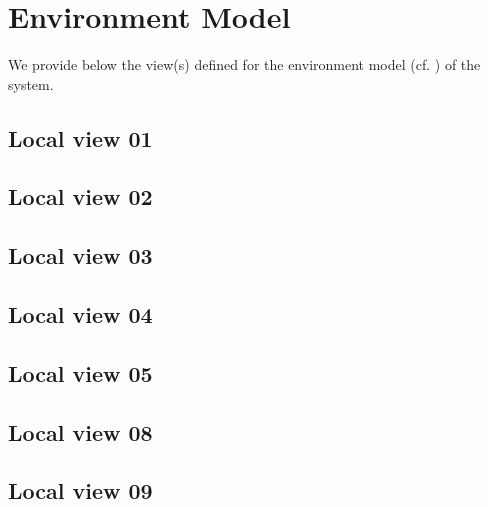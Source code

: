 \chapter{Environment Model}
\label{chap:lu.uni.lassy.excalibur.examples.icrash-EM}



We provide below the view(s) defined for the \msrmessir environment model (cf. \cite{messirbook}) of the system. 


\section{Local view 01}
\label{sec:lu.uni.lassy.excalibur.examples.icrash-EM-view-01-local}

\section{Local view 02}
\label{sec:lu.uni.lassy.excalibur.examples.icrash-EM-view-02-local}

\section{Local view 03}
\label{sec:lu.uni.lassy.excalibur.examples.icrash-EM-view-03-local}

\section{Local view 04}
\label{sec:lu.uni.lassy.excalibur.examples.icrash-EM-view-04-local}

\section{Local view 05}
\label{sec:lu.uni.lassy.excalibur.examples.icrash-EM-view-05-local}

\section{Local view 08}
\label{sec:lu.uni.lassy.excalibur.examples.icrash-EM-view-08-local}

\section{Local view 09}
\label{sec:lu.uni.lassy.excalibur.examples.icrash-EM-view-09-local}

